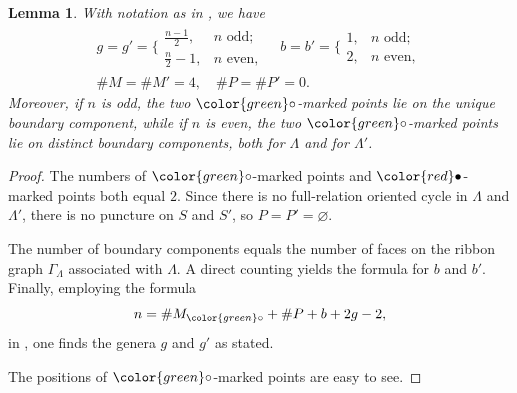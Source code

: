 \documentclass[11pt,reqno]{amsart}
\theoremstyle{plain}
\newtheorem{lemma}[theorem]{Lemma}
\theoremstyle{definition}
\theoremstyle{remark}
\numberwithin{equation}{section}
\begin{document}
\begin{lemma}\label{lem:ribbon surface}
    With notation as in \cite[Theorem 7.4]{APS}, we have
    \[\begin{gathered}
        g=g'=\Bigg\{\!\!\!\begin{array}{ll}
            \frac{n-1}{2}, & n\text{ odd}; \\
            \frac{n}{2}-1, & n\text{ even},
        \end{array}\quad
        b=b'=\bigg\{\!\!\!\begin{array}{ll}
            1, & n\text{ odd}; \\
            2, & n\text{ even},
        \end{array}\\
        \#M=\#M'=4,\quad\#P=\#P'=0.
    \end{gathered}\]
    Moreover, if $n$ is odd, the two $\color{green}\circ$-marked points lie on the unique boundary component, while if $n$ is even, the two $\color{green}\circ$-marked points lie on distinct boundary components, both for $\Lambda$ and for $\Lambda'$.
\end{lemma}
\begin{proof}
    The numbers of $\color{green}\circ$-marked points and $\color{red}\bullet$-marked points both equal $2$. Since there is no full-relation oriented cycle in $\Lambda$ and $\Lambda'$, there is no puncture on $S$ and $S'$, so $P=P'=\varnothing$.
    \par The number of boundary components equals the number of faces \cite[Definition 1.4]{OPS} on the ribbon graph $\Gamma_{\Lambda}$ associated with $\Lambda$. A direct counting yields the formula for $b$ and $b'$. Finally, employing the formula
    \[n=\#M_{\color{green}\circ}+\#P+b+2g-2,\]
    in \cite[Proposition 3.12]{APS}, one finds the genera $g$ and $g'$ as stated.
    \par The positions of $\color{green}\circ$-marked points are easy to see.
\end{proof}
\end{document}
